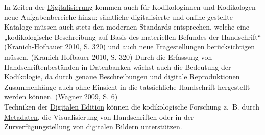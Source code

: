 \documentclass{article}
\begin{document}
        In Zeiten der \href{http://gams.uni-graz.at/o:konde.61}{Digitalisierung} kommen auch für Kodikologinnen und Kodikologen neue Aufgabenbereiche hinzu: sämtliche digitalisierte und online-gestellte Kataloge müssen auch stets den modernen Standards entsprechen, welche eine „kodikologische Beschreibung auf Basis des materiellen Befundes der Handschrift“ (Kranich-Hofbauer 2010, S. 320) und auch neue Fragestellungen berücksichtigen müssen. (Kranich-Hofbauer 2010, S. 320) Durch die Erfassung von Handschriftenbeständen in Datenbanken wächst auch die Bedeutung der Kodikologie, da durch genaue Beschreibungen und digitale Reproduktionen Zusammenhänge auch ohne Einsicht in die tatsächliche Handschrift hergestellt werden können. (Wagner 2009, S. 6)\\
            
        Techniken der \href{http://gams.uni-graz.at/o:konde.59}{Digitalen Edition} können die kodikologische Forschung z. B. durch \href{http://gams.uni-graz.at/o:konde.125}{Metadaten}, die Visualisierung von Handschriften oder in der \href{http://gams.uni-graz.at/o:konde.123}{Zurverfügungstellung von digitalen Bildern} unterstützen.\\
            
\end{document}
